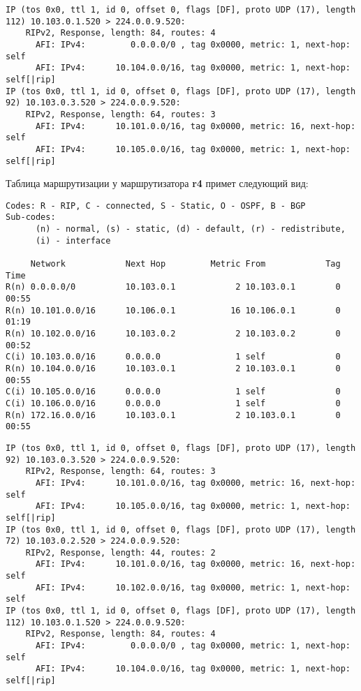 \documentclass[a4paper,12pt]{article}
\begin{document}
\begin{Verbatim}
IP (tos 0x0, ttl 1, id 0, offset 0, flags [DF], proto UDP (17), length 112) 10.103.0.1.520 > 224.0.0.9.520: 
	RIPv2, Response, length: 84, routes: 4
	  AFI: IPv4:         0.0.0.0/0 , tag 0x0000, metric: 1, next-hop: self
	  AFI: IPv4:      10.104.0.0/16, tag 0x0000, metric: 1, next-hop: self[|rip]
IP (tos 0x0, ttl 1, id 0, offset 0, flags [DF], proto UDP (17), length 92) 10.103.0.3.520 > 224.0.0.9.520: 
	RIPv2, Response, length: 64, routes: 3
	  AFI: IPv4:      10.101.0.0/16, tag 0x0000, metric: 16, next-hop: self
	  AFI: IPv4:      10.105.0.0/16, tag 0x0000, metric: 1, next-hop: self[|rip]
\end{Verbatim}

Таблица маршрутизации у маршрутизатора \textbf{r4} примет следующий вид:

\begin{Verbatim}
Codes: R - RIP, C - connected, S - Static, O - OSPF, B - BGP
Sub-codes:
      (n) - normal, (s) - static, (d) - default, (r) - redistribute,
      (i) - interface

     Network            Next Hop         Metric From            Tag Time
R(n) 0.0.0.0/0          10.103.0.1            2 10.103.0.1        0 00:55
R(n) 10.101.0.0/16      10.106.0.1           16 10.106.0.1        0 01:19
R(n) 10.102.0.0/16      10.103.0.2            2 10.103.0.2        0 00:52
C(i) 10.103.0.0/16      0.0.0.0               1 self              0
R(n) 10.104.0.0/16      10.103.0.1            2 10.103.0.1        0 00:55
C(i) 10.105.0.0/16      0.0.0.0               1 self              0
C(i) 10.106.0.0/16      0.0.0.0               1 self              0
R(n) 172.16.0.0/16      10.103.0.1            2 10.103.0.1        0 00:55
\end{Verbatim}

\begin{Verbatim}
IP (tos 0x0, ttl 1, id 0, offset 0, flags [DF], proto UDP (17), length 92) 10.103.0.3.520 > 224.0.0.9.520: 
	RIPv2, Response, length: 64, routes: 3
	  AFI: IPv4:      10.101.0.0/16, tag 0x0000, metric: 16, next-hop: self
	  AFI: IPv4:      10.105.0.0/16, tag 0x0000, metric: 1, next-hop: self[|rip]
IP (tos 0x0, ttl 1, id 0, offset 0, flags [DF], proto UDP (17), length 72) 10.103.0.2.520 > 224.0.0.9.520: 
	RIPv2, Response, length: 44, routes: 2
	  AFI: IPv4:      10.101.0.0/16, tag 0x0000, metric: 16, next-hop: self
	  AFI: IPv4:      10.102.0.0/16, tag 0x0000, metric: 1, next-hop: self
IP (tos 0x0, ttl 1, id 0, offset 0, flags [DF], proto UDP (17), length 112) 10.103.0.1.520 > 224.0.0.9.520: 
	RIPv2, Response, length: 84, routes: 4
	  AFI: IPv4:         0.0.0.0/0 , tag 0x0000, metric: 1, next-hop: self
	  AFI: IPv4:      10.104.0.0/16, tag 0x0000, metric: 1, next-hop: self[|rip]
\end{Verbatim}
\end{document}
